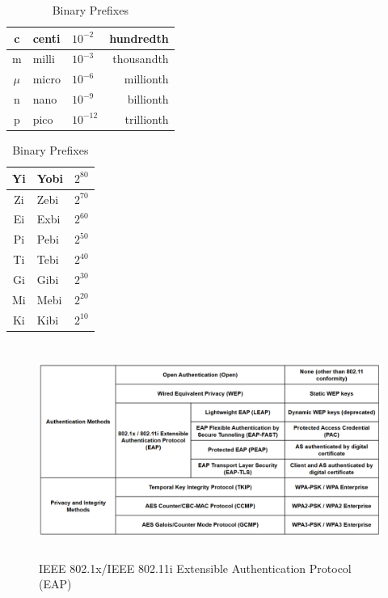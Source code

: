 \documentclass[12pt]{article}
\begin{document}
\begin{table}[H]
\begin{minipage}{.45\linewidth}
\begin{tabular}{cllr}
	c 	& centi	& $10^{-2}$	& hundredth\\\hline
	m 	& milli	& $10^{-3}$	& thousandth\\\hline
	$\mu$ & micro	& $10^{-6}$	& millionth\\\hline
	n 	& nano	& $10^{-9}$	& billionth\\\hline
	p 	& pico	& $10^{-12}$	& trillionth\\\hline
	\end{tabular}
	\centering
	\caption{Binary Prefixes \label{tab:BINARY PREFIXES}}
	\begin{tabular}{cll}
	\hline
	Yi 	& Yobi	& $2^{80}$\\\hline
	Zi	& Zebi	& $2^{70}$\\\hline
	Ei	& Exbi	& $2^{60}$\\\hline
	Pi	& Pebi	& $2^{50}$\\\hline
	Ti 	& Tebi	& $2^{40}$\\\hline
	Gi	& Gibi	& $2^{30}$\\\hline
	Mi 	& Mebi	& $2^{20}$\\\hline
	Ki	& Kibi	& $2^{10}$\\\hline
	\end{tabular}\end{minipage}\end{table}

	\begin{figure}[H]
	\centering
	\caption{IEEE 802.1x/IEEE 802.11i Extensible Authentication Protocol (EAP) \label{fig:WIRELESS SECURITY}}
	\includegraphics[width=\textwidth,height=7cm]{Wireless_Security}
	\end{figure}

\end{document}
